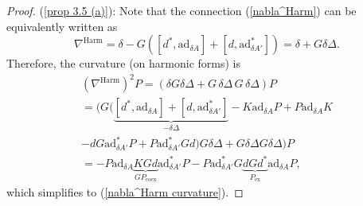 \documentclass[11pt,a4paper]{amsart}
\theoremstyle{plain} %
\theoremstyle{definition}
\theoremstyle{remark}
\newcommand{\g}{\mathfrak{g}}
\newcommand{\mr}{\mathrm}
\newcommand{\bt}{\bullet}
\newcommand{\ra}{\rightarrow}
\newcommand{\mc}{\mathcal}
\newcommand{\ad}{\mathrm{ad}}
\newcommand{\ul}{\underline}
\begin{document}
{%
\begin{proof}
    (\ref{prop 3.5 (a)}): 
Note that the connection (\ref{nabla^Harm}) can be equivalently written as 
$$ 
\nabla^\mr{Harm}=\delta-G([d^*,\mr{ad}_{\delta A}]+[d,\mr{ad}^*_{\delta A'}]) = \delta+ G \delta \Delta.
$$
Therefore, the curvature (on harmonic forms) is 
\begin{multline}
(\nabla^\mr{Harm})^2 P = (\delta G \delta \Delta+ G \,\delta \Delta\, G \,\delta \Delta )P
\\
=\Big(G\Big(\underbrace{[d^*,\ad_{\delta A}]+[d,\ad^*_{\delta A'}]}_{-\delta \Delta}-K\ad_{\delta A}P+P\ad_{\delta A}K\\
-dG \ad^*_{\delta A'} P+P\ad^*_{\delta A'} Gd\Big) G\delta \Delta + G\delta\Delta G \delta\Delta \Big)P\\
=-P\ad_{\delta A}\underbrace{KGd}_{G P_\mr{coex}} \ad^*_{\delta A'} P- P\ad^*_{\delta A'} G\underbrace{d G d^*}_{P_\mr{ex}} \ad_{\delta A} P,
\end{multline}
which simplifies to (\ref{nabla^Harm curvature}). 


\end{proof}}
\end{document}
